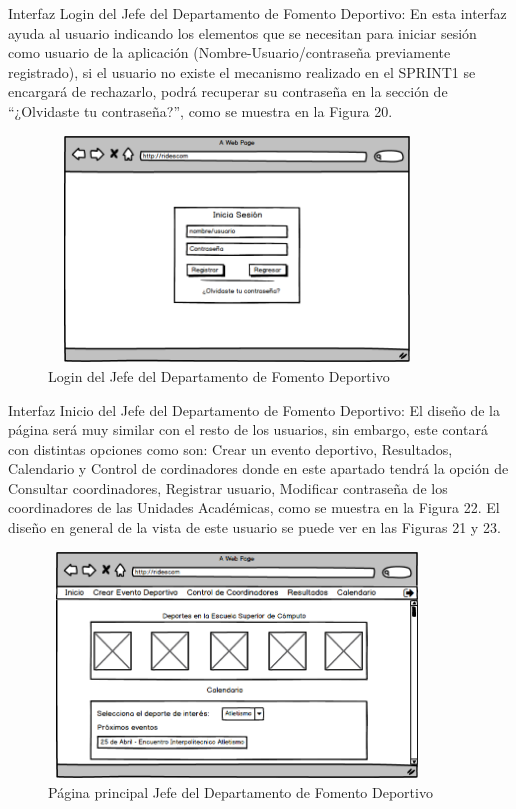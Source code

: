 	\noindent Interfaz Login del Jefe del Departamento de Fomento Deportivo: En esta interfaz ayuda al usuario indicando los elementos que se necesitan para iniciar sesión como usuario de la aplicación (Nombre-Usuario/contraseña previamente registrado), si el usuario no existe el mecanismo realizado en el SPRINT1 se encargará de rechazarlo, podrá recuperar su contraseña en la sección de “¿Olvidaste tu contraseña?”, como se muestra en la Figura 20.\pagebreak
	\begin{figure}[hbt!]
		\centering
		\includegraphics[width=10cm, height=6cm]{Imagenes/Disenos/p2LoginJFD.png}
		\caption{Login del Jefe del Departamento de Fomento Deportivo}
	\end{figure}
	
	\noindent Interfaz Inicio del Jefe del Departamento de Fomento Deportivo: El diseño de la página será muy similar con el resto de los usuarios, sin embargo, este contará con distintas opciones como son: Crear un evento deportivo, Resultados, Calendario y Control de cordinadores donde en este apartado tendrá la opción de Consultar coordinadores, Registrar usuario, Modificar contraseña de los coordinadores de las Unidades Académicas, como se muestra en la Figura 22. El diseño en general de la vista de este usuario se puede ver en  las Figuras 21 y 23.
	\begin{figure}[hbt!]
		\centering
		\includegraphics[width=10cm, height=6cm]{Imagenes/Disenos/p3InicioJefeFD.png}
		\caption{Página principal Jefe del Departamento de Fomento Deportivo}
	\end{figure}
	

